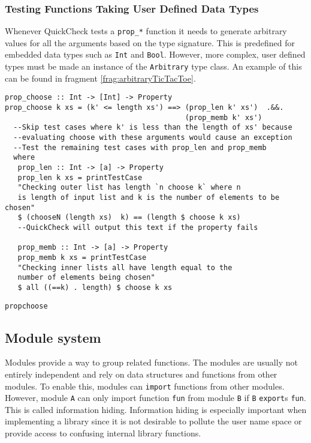 \subsubsection{Testing Functions Taking User Defined Data Types}
Whenever QuickCheck tests a \verb|prop_*| function it needs to generate arbitrary values for all the arguments based on the type signature. This is predefined for embedded data types such as \verb|Int| and \verb|Bool|. However, more complex, user defined types must be made an instance of the \verb|Arbitrary| type class. An example of this can be found in fragment \ref{frag:arbitraryTicTacToe}.


\begin{fragment}
\begin{lstlisting}
prop_choose :: Int -> [Int] -> Property  
prop_choose k xs = (k' <= length xs') ==> (prop_len k' xs')  .&&. 
                                          (prop_memb k' xs')     
  --Skip test cases where k' is less than the length of xs' because 
  --evaluating choose with these arguments would cause an exception
  --Test the remaining test cases with prop_len and prop_memb              
  where
   prop_len :: Int -> [a] -> Property
   prop_len k xs = printTestCase 
   "Checking outer list has length `n choose k` where n 
   is length of input list and k is the number of elements to be chosen"
   $ (chooseN (length xs)  k) == (length $ choose k xs)
   --QuickCheck will output this text if the property fails
   
   prop_memb :: Int -> [a] -> Property
   prop_memb k xs = printTestCase 
   "Checking inner lists all have length equal to the 
   number of elements being chosen"
   $ all ((==k) . length) $ choose k xs

\end{lstlisting}
\caption{\texttt{propchoose}}
\label{frag:prop_choose}
\end{fragment}

\subsection{Module system}
Modules provide a way to group related functions. The modules are usually not entirely independent and rely on data structures and functions from other modules. To enable this, modules can \texttt{import} functions from other modules. However, module \texttt{A} can only import function \texttt{fun} from module \texttt{B} if \texttt{B} \texttt{export}s \texttt{fun}. This is called information hiding. Information hiding is especially important when implementing a library since it is not desirable to pollute the user name space or provide access to confusing internal library functions.

